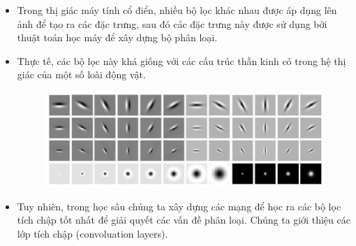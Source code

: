 \documentclass{book}
\begin{document}
    \begin{itemize}
        \item Trong thị giác máy tính cổ điển, nhiều bộ lọc khác nhau được áp dụng lên ảnh để tạo ra các đặc trưng, sau đó các đặc trưng này được sử dụng bởi thuật toán học máy để xây dựng bộ phân loại.
        \item Thực tế, các bộ lọc này khá giống với các cấu trúc thần kinh có trong hệ thị giác của một số loài động vật.

        \begin{figure}[H]
            \centering
            \includegraphics[width=1.0\linewidth]{images/filter.png}
            \label{fig:filter}
        \end{figure}
        \item Tuy nhiên, trong học sâu chúng ta xây dựng các mạng để học ra các bộ lọc tích chập tốt nhất để giải quyết các vấn đề phân loại. Chúng ta giới thiệu các lớp tích chập (convoluation layers).
    \end{itemize}
\end{document}
